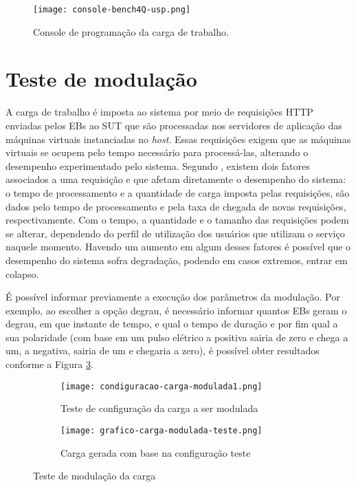 \begin{figure}[!htb]
	\centering
	\texttt{[image: console-bench4Q-usp.png]}
	\caption{Console de programação da carga de trabalho.}
	\label{fig:interface-criada-beanch4q}
	\fautor
\end{figure}


\section{Teste de modulação}

A carga de trabalho é imposta ao sistema por meio de requisições HTTP enviadas pelos EBs ao SUT que são processadas nos servidores de aplicação das máquinas virtuais instanciadas no \textit{host}. Essas requisições exigem que as máquinas virtuais se ocupem pelo tempo necessário para processá-las, alterando o desempenho experimentado pelo sistema.
Segundo , existem dois fatores associados a uma requisição e que afetam diretamente o desempenho do sistema:
o tempo de processamento e a quantidade de carga imposta pelas requisições, são dados pelo tempo de processamento e pela taxa de chegada de novas requisições, respectivamente. Com o tempo, a quantidade e o tamanho das requisições podem se alterar, dependendo do perfil de utilização dos usuários que utilizam o serviço naquele momento. Havendo um aumento em algum desses fatores é possível que o desempenho do sistema sofra degradação, podendo em casos extremos, entrar em colapso.

É possível informar previamente a execução dos parâmetros da modulação. Por exemplo, ao escolher a opção degrau, é necessário informar quantos EBs geram o degrau, em que instante de tempo, e qual o tempo de duração e por fim qual a sua polaridade (com base em um pulso elétrico a positiva sairia de zero e chega a um, a negativa, sairia de um e chegaria a zero), é possível obter resultados conforme a Figura \ref{fig:grafico-carga-modulada-teste}.

\begin{figure}[!htb]
	\centering
	\begin{subfigure}{\linewidth}
		\centering
		\texttt{[image: condiguracao-carga-modulada1.png]}
		\caption{Teste de configuração da carga a ser modulada}
		\label{fig:configuracao-carga-modulada-teste}
	\end{subfigure}
	
	\begin{subfigure}{\linewidth}
		\centering
		\texttt{[image: grafico-carga-modulada-teste.png]}
		\caption{Carga gerada com base na configuração teste}
		\label{fig:grafico-carga-modulada-teste}
	\end{subfigure}  
	\caption{Teste de modulação da carga}  
	\label{fig:carga-modulada-teste}
	\fautor
\end{figure}  

